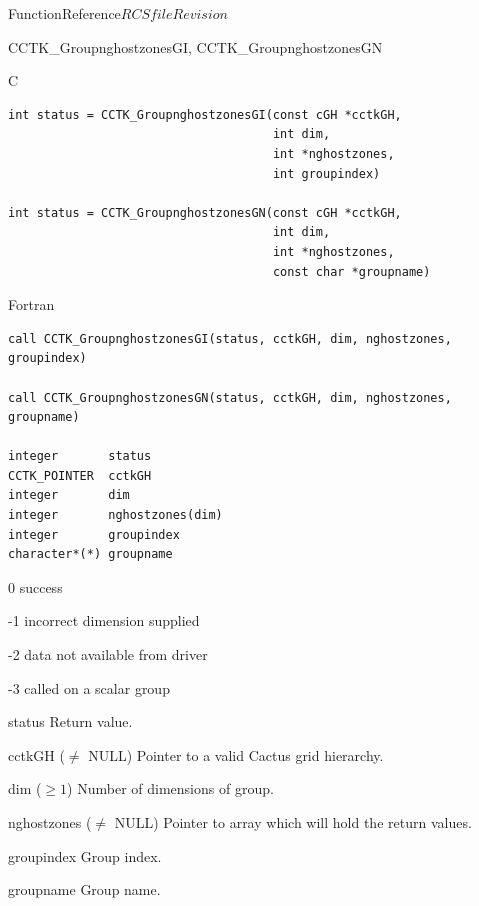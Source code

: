 \begin{cactuspart}{FunctionReference}{$RCSfile$}{$Revision$}
\begin{FunctionDescription}{CCTK\_GroupnghostzonesGI, CCTK\_GroupnghostzonesGN}
\begin{SynopsisSection}
\begin{Synopsis}{C}
\begin{verbatim}
int status = CCTK_GroupnghostzonesGI(const cGH *cctkGH,
                                     int dim,
                                     int *nghostzones,
                                     int groupindex)

int status = CCTK_GroupnghostzonesGN(const cGH *cctkGH,
                                     int dim,
                                     int *nghostzones,
                                     const char *groupname)
\end{verbatim}
\end{Synopsis}
\begin{Synopsis}{Fortran}
\begin{verbatim}
call CCTK_GroupnghostzonesGI(status, cctkGH, dim, nghostzones, groupindex)

call CCTK_GroupnghostzonesGN(status, cctkGH, dim, nghostzones, groupname)

integer       status
CCTK_POINTER  cctkGH
integer       dim
integer       nghostzones(dim)
integer       groupindex
character*(*) groupname
\end{verbatim}
\end{Synopsis}
\end{SynopsisSection}

\begin{ResultSection}
\begin{Result}{\rm 0} success \end{Result}
\begin{Result}{\rm -1} incorrect dimension supplied \end{Result}
\begin{Result}{\rm -2} data not available from driver \end{Result}
\begin{Result}{\rm -3} called on a scalar group \end{Result}
\end{ResultSection}

\begin{ParameterSection}
\begin{Parameter}{status} Return value. \end{Parameter}
\begin{Parameter}{cctkGH ($\ne$ NULL)} Pointer to a valid Cactus grid hierarchy. \end{Parameter}
\begin{Parameter}{dim ($\ge 1$)} Number of dimensions of group. \end{Parameter}
\begin{Parameter}{nghostzones ($\ne$ NULL)} Pointer to array which will hold the return values. \end{Parameter}
\begin{Parameter}{groupindex} Group index. \end{Parameter}
\begin{Parameter}{groupname} Group name. \end{Parameter}
\end{ParameterSection}


\end{FunctionDescription}
\end{cactuspart}
